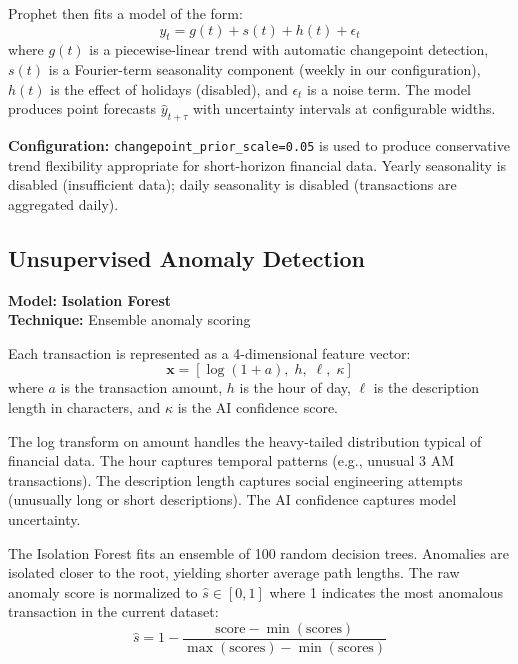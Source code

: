 \documentclass[11pt,a4paper]{article}
\newcommand{\confidence}{\kappa}
\newcommand{\anomaly}{\hat{s}}
\begin{document}
Prophet then fits a model of the form:
\begin{equation}
  y_t = g(t) + s(t) + h(t) + \epsilon_t
  \label{eq:prophet}
\end{equation}
where $g(t)$ is a piecewise-linear trend with automatic changepoint detection, $s(t)$ is a Fourier-term seasonality component (weekly in our configuration), $h(t)$ is the effect of holidays (disabled), and $\epsilon_t$ is a noise term. The model produces point forecasts $\hat{y}_{t+\tau}$ with uncertainty intervals at configurable widths.

\textbf{Configuration:} \texttt{changepoint\_prior\_scale=0.05} is used to produce conservative trend flexibility appropriate for short-horizon financial data. Yearly seasonality is disabled (insufficient data); daily seasonality is disabled (transactions are aggregated daily).

\subsection{Unsupervised Anomaly Detection}
\label{subsec:anomaly}

\textbf{Model:} \textbf{Isolation Forest} \cite{liu2008isolation} \\
\textbf{Technique:} Ensemble anomaly scoring

Each transaction is represented as a 4-dimensional feature vector:
\begin{equation}
  \mathbf{x} = [\log(1 + a),\; h,\; \ell,\; \confidence]
  \label{eq:anomaly-features}
\end{equation}
where $a$ is the transaction amount, $h$ is the hour of day, $\ell$ is the description length in characters, and $\confidence$ is the AI confidence score.

The log transform on amount handles the heavy-tailed distribution typical of financial data. The hour captures temporal patterns (e.g., unusual 3 AM transactions). The description length captures social engineering attempts (unusually long or short descriptions). The AI confidence captures model uncertainty.

The Isolation Forest fits an ensemble of 100 random decision trees. Anomalies are isolated closer to the root, yielding shorter average path lengths. The raw anomaly score is normalized to $\anomaly \in [0, 1]$ where 1 indicates the most anomalous transaction in the current dataset:
\begin{equation}
  \anomaly = 1 - \frac{\text{score} - \min(\text{scores})}{\max(\text{scores}) - \min(\text{scores})}
\end{equation}
\end{document}
